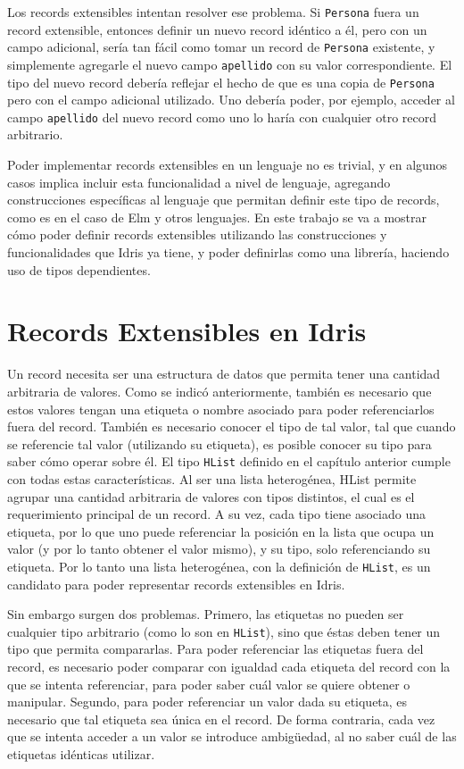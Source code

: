 Los records extensibles intentan resolver ese problema. Si \texttt{Persona} fuera un record extensible, entonces definir un nuevo record idéntico a él, pero con un campo adicional, sería tan fácil como tomar un record de \texttt{Persona} existente, y simplemente agregarle el nuevo campo \texttt{apellido} con su valor correspondiente. El tipo del nuevo record debería reflejar el hecho de que es una copia de \texttt{Persona} pero con el campo adicional utilizado. Uno debería poder, por ejemplo, acceder al campo \texttt{apellido} del nuevo record como uno lo haría con cualquier otro record arbitrario.

Poder implementar records extensibles en un lenguaje no es trivial, y en algunos casos implica incluir esta funcionalidad a nivel de lenguaje, agregando construcciones específicas al lenguaje que permitan definir este tipo de records, como es en el caso de Elm \cite{ElmRecords} y otros lenguajes.
En este trabajo se va a mostrar cómo poder definir records extensibles utilizando las construcciones y funcionalidades que Idris ya tiene, y poder definirlas como una librería, haciendo uso de tipos dependientes.

\section{Records Extensibles en Idris}

Un record necesita ser una estructura de datos que permita tener una cantidad arbitraria de valores. Como se indicó anteriormente, también  es necesario que estos valores tengan una etiqueta o nombre asociado para poder referenciarlos fuera del record. También es necesario conocer el tipo de tal valor, tal que cuando se referencie tal valor (utilizando su etiqueta), es posible conocer su tipo para saber cómo operar sobre él.
El tipo \texttt{HList} definido en el capítulo anterior cumple con todas estas características. Al ser una lista heterogénea, HList permite agrupar una cantidad arbitraria de valores con tipos distintos, el cual es el requerimiento principal de un record. A su vez, cada tipo tiene asociado una etiqueta, por lo que uno puede referenciar la posición en la lista que ocupa un valor (y por lo tanto obtener el valor mismo), y su tipo, solo referenciando su etiqueta.
Por lo tanto una lista heterogénea, con la definición de \texttt{HList}, es un candidato para poder representar records extensibles en Idris.

Sin embargo surgen dos problemas. Primero, las etiquetas no pueden ser cualquier tipo arbitrario (como lo son en \texttt{HList}), sino que éstas deben tener un tipo que permita compararlas. Para poder referenciar las etiquetas fuera del record, es necesario poder comparar con igualdad cada etiqueta del record con la que se intenta referenciar, para poder saber cuál valor se quiere obtener o manipular. Segundo, para poder referenciar un valor dada su etiqueta, es necesario que tal etiqueta sea única en el record. De forma contraria, cada vez que se intenta acceder a un valor se introduce ambigüedad, al no saber cuál de las etiquetas idénticas utilizar.

